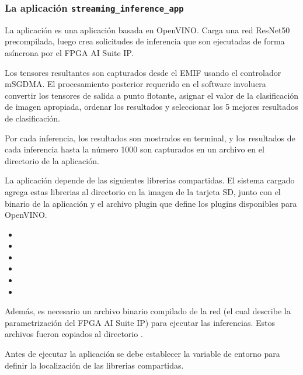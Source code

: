 \subsubsection{La aplicaci\'on \texttt{streaming\_inference\_app}}

    La aplicaci\'on  es una aplicaci\'on basada en OpenVINO. Carga una red ResNet50 precompilada, luego crea solicitudes de inferencia que son ejecutadas de forma as\'incrona por el FPGA AI Suite IP.

    Los tensores resultantes son capturados desde el EMIF usando el controlador mSGDMA. El procesamiento posterior requerido en el software involucra convertir los tensores de salida a punto flotante, asignar el valor de la clasificaci\'on de imagen apropiada, ordenar los resultados y seleccionar los 5 mejores resultados de clasificaci\'on.

    Por cada inferencia, los resultados son mostrados en terminal, y los resultados de cada inferencia hasta la n\'umero 1000 son capturados en un archivo  en el directorio de la aplicaci\'on.

    La aplicaci\'on depende de las siguientes librerias compartidas. El sistema cargado agrega estas librerias al directorio  en la imagen de la tarjeta SD, junto con el binario de la aplicaci\'on y el archivo plugin  que define los plugins disponibles para OpenVINO.
    \begin{itemize}
        \item {}
        \item {}
        \item {}
        \item {}
        \item {}
        \item {}
    \end{itemize}

    Adem\'as, es necesario un archivo binario compilado de la red (el cual describe la parametrizaci\'on del FPGA AI Suite IP) para ejecutar las inferencias. Estos archivos fueron copiados al directorio .

    Antes de ejecutar la aplicaci\'on se debe establecer la variable de entorno  para definir la localizaci\'on de las librerias compartidas.

